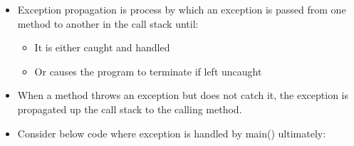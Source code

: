 \setlength{\columnsep}{3pt}
\begin{flushleft}
	
	\begin{itemize}
		\item Exception propagation is process by which an exception is passed from one method to another in the call stack until:
		\begin{itemize}
			\item It is either caught and handled
			\item Or causes the program to terminate if left uncaught
		\end{itemize}
		\item When a method throws an exception but does not catch it, the exception is propagated up the call stack to the calling method. 
		
		\item Consider below code where exception is handled by main() ultimately:
		\bigskip
		\newpage
		\bigskip
\end{itemize}
\end{flushleft}
